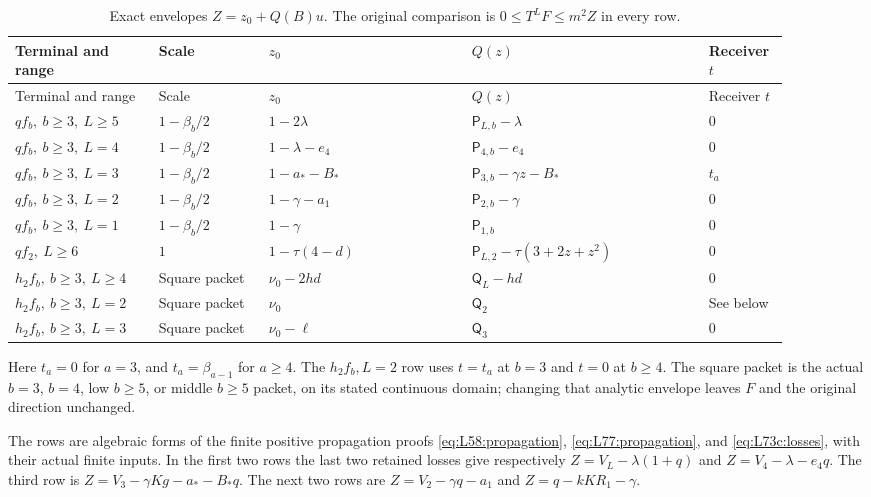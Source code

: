 \begingroup\small\setlength{\tabcolsep}{3pt}
\begin{longtable}{p{0.17\linewidth}p{0.13\linewidth}p{0.24\linewidth}p{0.28\linewidth}p{0.08\linewidth}}
\caption{Exact envelopes \(Z=z_0+Q(B)u\).
The original comparison is \(0\le T^LF\le m^2Z\) in every row.}
\label{tab:q117-unified:finite-envelopes}\\
\hline
Terminal and range & Scale & \(z_0\) & \(Q(z)\) & Receiver \(t\)\\
\hline\endfirsthead
\hline
Terminal and range & Scale & \(z_0\) & \(Q(z)\) & Receiver \(t\)\\
\hline\endhead
\(qf_b,\ b\ge3,\ L\ge5\)
 & \(1-\beta_b/2\) & \(1-2\lambda\)
 & \(\mathsf P_{L,b}-\lambda\) & \(0\)\\
\(qf_b,\ b\ge3,\ L=4\)
 & \(1-\beta_b/2\) & \(1-\lambda-e_4\)
 & \(\mathsf P_{4,b}-e_4\) & \(0\)\\
\(qf_b,\ b\ge3,\ L=3\)
 & \(1-\beta_b/2\) & \(1-a_*-B_*\)
 & \(\mathsf P_{3,b}-\gamma z-B_*\) & \(t_a\)\\
\(qf_b,\ b\ge3,\ L=2\)
 & \(1-\beta_b/2\) & \(1-\gamma-a_1\)
 & \(\mathsf P_{2,b}-\gamma\) & \(0\)\\
\(qf_b,\ b\ge3,\ L=1\)
 & \(1-\beta_b/2\) & \(1-\gamma\)
 & \(\mathsf P_{1,b}\) & \(0\)\\
\(qf_2,\ L\ge6\)
 & \(1\) & \(1-\tau(4-d)\)
 & \(\mathsf P_{L,2}-\tau(3+2z+z^2)\) & \(0\)\\
\(h_2f_b,\ b\ge3,\ L\ge4\)
 & Square packet & \(\nu_0-2hd\)
 & \(\mathsf Q_L-hd\) & \(0\)\\
\(h_2f_b,\ b\ge3,\ L=2\)
 & Square packet & \(\nu_0\)
 & \(\mathsf Q_2\) & See below\\
\(h_2f_b,\ b\ge3,\ L=3\)
 & Square packet & \(\nu_0-\ell\)
 & \(\mathsf Q_3\) & \(0\)\\
\hline
\end{longtable}
\endgroup

Here \(t_a=0\) for \(a=3\), and \(t_a=\beta_{a-1}\) for
\(a\ge4\). The \(h_2f_b,L=2\) row uses \(t=t_a\) at \(b=3\)
and \(t=0\) at \(b\ge4\). The square packet is the actual
\(b=3\), \(b=4\), low \(b\ge5\), or middle \(b\ge5\) packet,
on its stated continuous domain; changing that analytic envelope leaves \(F\) and the original direction unchanged.

The rows are algebraic forms of the finite positive propagation
proofs \eqref{eq:L58:propagation}, \eqref{eq:L77:propagation}, and
\eqref{eq:L73c:losses}, with their actual finite inputs. In the first two rows the
last two retained losses give respectively
\(Z=V_L-\lambda(1+q)\) and \(Z=V_4-\lambda-e_4q\).
The third row is \(Z=V_3-\gamma Kg-a_*-B_*q\).
The next two rows are \(Z=V_2-\gamma q-a_1\) and
\(Z=q-kKR_1-\gamma\).


